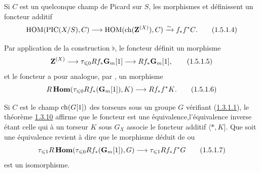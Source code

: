 \documentclass[10pt]{../fichiers-configuration-latex/smfart}
\begin{document}
Si $C$ est un quelconque champ de Picard sur $S$, les morphismes
 et  définissent un foncteur additif
\begin{equation*}
\operatorname{HOM}(\operatorname{PIC}(X/S),C)\longrightarrow\operatorname{HOM}(\operatorname{ch}(\mathbf{Z}^{(X)}),
C)\xrightarrow{\sim} f_{\ast}f^{\ast}C{}.\tag{1.5.1.4}
\end{equation*}

Par application de la construction $\flat$, le foncteur 
définit un morphisme
\begin{equation*}
\mathbf{Z}^{(X)}\longrightarrow \tau_{\leqslant 0}
Rf_{\ast}\mathbf{G}_{m}[1]\longrightarrow
Rf_{\ast}\mathbf{G}_{m}[1]{},\tag{1.5.1.5}
\end{equation*}%
et le foncteur  a pour analogue, par , un morphisme
\begin{equation*}
R\operatorname{\mathbf{Hom}}(\tau_{\leqslant 0} Rf_{\ast}(\mathbf{G}_{m}[1]),K)\longrightarrow
Rf_{\ast} f^{\ast}K{}.\tag{1.5.1.6}
\end{equation*}

Si $C$ est le champ $\operatorname{ch}(G[1])$ des torseurs sous un groupe $G$
vérifiant (\hyperref[XVIII.par1.3.1.1]{1.3.1.1}), le théorème \hyperref[XVIII.thm1.3.10]{1.3.10}
affirme que le foncteur 
 est une équivalence,\pageoriginale l'équivalence inverse étant
celle qui à un torseur $K$ sous $G_{X}$ associe le foncteur additif
$\langle \ast,K]$. Que  soit une équivalence revient à dire que le
morphisme déduit de  ou 
\begin{equation*}
\tau_{\leqslant 1}R\operatorname{\mathbf{Hom}}(\tau_{\leqslant
0}Rf_{\ast}(\mathbf{G}_{m}[1]),G)\longrightarrow \tau_{\leqslant 1}
Rf_{\ast}f^{\ast}G\tag{1.5.1.7}
\end{equation*}%
est un isomorphisme.
\end{document}
